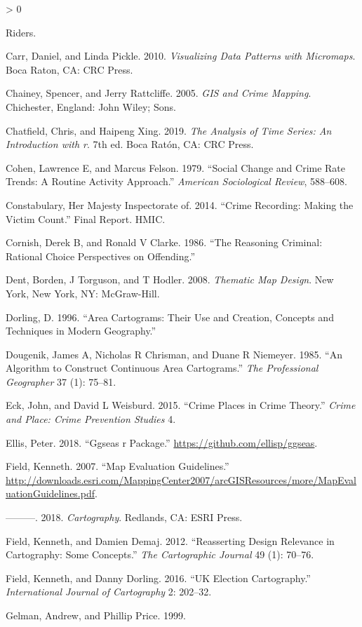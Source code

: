 \documentclass[
]{book}
\newlength{\cslhangindent}
\newenvironment{CSLReferences}[2] %
 {%
  \setlength{\parindent}{0pt}
  \ifodd #1 \everypar{\setlength{\hangindent}{\cslhangindent}}\ignorespaces\fi
  \ifnum #2 > 0
  \setlength{\parskip}{#2\baselineskip}
  \fi
 }%
 {}
\begin{document}
\begin{CSLReferences}{1}{0}
Riders.

\leavevmode\hypertarget{ref-Carr_2010}{}%
Carr, Daniel, and Linda Pickle. 2010. \emph{Visualizing Data Patterns with Micromaps}. Boca Raton, CA: CRC Press.

\leavevmode\hypertarget{ref-Chainey_2005}{}%
Chainey, Spencer, and Jerry Rattcliffe. 2005. \emph{GIS and Crime Mapping}. Chichester, England: John Wiley; Sons.

\leavevmode\hypertarget{ref-Chatfield_2019}{}%
Chatfield, Chris, and Haipeng Xing. 2019. \emph{The Analysis of Time Series: An Introduction with r}. 7th ed. Boca Ratón, CA: CRC Press.

\leavevmode\hypertarget{ref-Cohen_1979}{}%
Cohen, Lawrence E, and Marcus Felson. 1979. {``Social Change and Crime Rate Trends: A Routine Activity Approach.''} \emph{American Sociological Review}, 588--608.

\leavevmode\hypertarget{ref-HMIC_2014}{}%
Constabulary, Her Majesty Inspectorate of. 2014. {``Crime Recording: Making the Victim Count.''} Final Report. HMIC.

\leavevmode\hypertarget{ref-Cornish_1986}{}%
Cornish, Derek B, and Ronald V Clarke. 1986. {``The Reasoning Criminal: Rational Choice Perspectives on Offending.''}

\leavevmode\hypertarget{ref-Dent_2008}{}%
Dent, Borden, J Torguson, and T Hodler. 2008. \emph{Thematic Map Design}. New York, New York, NY: McGraw-Hill.

\leavevmode\hypertarget{ref-Dorling_1996}{}%
Dorling, D. 1996. {``Area Cartograms: Their Use and Creation, Concepts and Techniques in Modern Geography.''}

\leavevmode\hypertarget{ref-Dougenik_1985}{}%
Dougenik, James A, Nicholas R Chrisman, and Duane R Niemeyer. 1985. {``An Algorithm to Construct Continuous Area Cartograms.''} \emph{The Professional Geographer} 37 (1): 75--81.

\leavevmode\hypertarget{ref-Eck_2015}{}%
Eck, John, and David L Weisburd. 2015. {``Crime Places in Crime Theory.''} \emph{Crime and Place: Crime Prevention Studies} 4.

\leavevmode\hypertarget{ref-Ellis_2018}{}%
Ellis, Peter. 2018. {``Ggseas r Package.''} \url{https://github.com/ellisp/ggseas}.

\leavevmode\hypertarget{ref-Field_2007}{}%
Field, Kenneth. 2007. {``Map Evaluation Guidelines.''} \url{http://downloads.esri.com/MappingCenter2007/arcGISResources/more/MapEvaluationGuidelines.pdf}.

\leavevmode\hypertarget{ref-Field_2018}{}%
---------. 2018. \emph{Cartography}. Redlands, CA: ESRI Press.

\leavevmode\hypertarget{ref-Field_2012}{}%
Field, Kenneth, and Damien Demaj. 2012. {``Reasserting Design Relevance in Cartography: Some Concepts.''} \emph{The Cartographic Journal} 49 (1): 70--76.

\leavevmode\hypertarget{ref-Field_2016}{}%
Field, Kenneth, and Danny Dorling. 2016. {``UK Election Cartography.''} \emph{International Journal of Cartography} 2: 202--32.

\leavevmode\hypertarget{ref-Gelman_1999}{}%
Gelman, Andrew, and Phillip Price. 1999. 
\end{CSLReferences}
\end{document}
